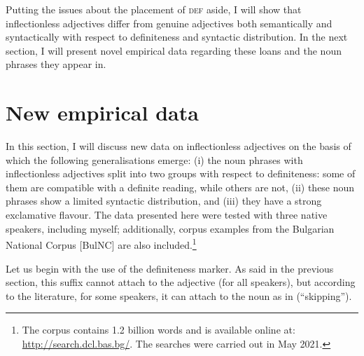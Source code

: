 \documentclass[output=paper]{langscibook}
\begin{document}
Putting the issues about the placement of \textsc{def} aside, I will show that inflectionless adjectives differ from genuine adjectives both semantically and syntactically with respect to definiteness and syntactic distribution. %
In the next section, I will present novel empirical data regarding these loans and the noun phrases they appear in.



\section{New empirical data}\label{ge-sec-data}

In this section, I will discuss new data on inflectionless adjectives on the basis of which the following generalisations emerge: (i) 
the noun phrases with inflectionless adjectives split into two groups with respect to definiteness: some of them are compatible with a definite reading, while others are not, %
(ii) these noun phrases show a limited syntactic distribution, and (iii) they have a strong exclamative flavour. The data presented here were tested with three native speakers, including myself; additionally, corpus examples from the Bulgarian National Corpus [BulNC] are also included.\footnote{The corpus contains 1.2 billion words and is available online at: \url{http://search.dcl.bas.bg/}. The searches were carried out in May 2021.}

Let us begin with the use of the definiteness marker. As said in the previous section, this suffix cannot attach to the adjective (for all speakers), but according to the literature, for some speakers, it can attach to the noun as in  (``skipping''). 

\judgewidth{\%}
\z 
\end{document}
